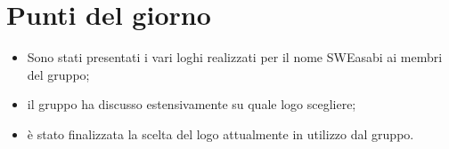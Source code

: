 \section{Punti del giorno}
        \begin{itemize}
            \item Sono stati presentati i vari loghi realizzati per il nome SWEasabi ai membri del gruppo;
            \item il gruppo ha discusso estensivamente su quale logo scegliere;
            \item è stato finalizzata la scelta del logo attualmente in utilizzo dal gruppo.
        \end{itemize}
